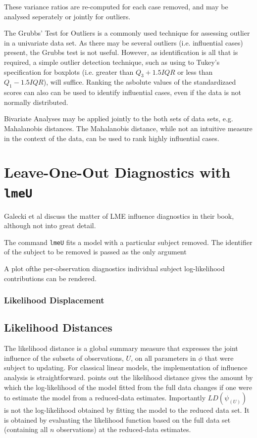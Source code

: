 \documentclass[12pt, a4paper]{report}
\theoremstyle{plain}
\theoremstyle{definition}
\theoremstyle{remark}
\begin{document}
These variance ratios are re-computed for each case removed, and may be analysed seperately or jointly for outliers. 

The Grubbs' Test for Outliers is a commonly used technique for assessing outlier in a univariate data set. As there may be several outliers (i.e. influential cases) present, the Grubbs test is not useful. However, as identification is all that is required, a simple outlier detection technique, such as using to Tukey's specification for boxplots (i.e. greater than $Q_3 +1.5 IQR$ or less than $Q_1 - 1.5 IQR$), will suffice. Ranking the asbolute values of the standardizaed scores can also can be used to identify influential cases, even if the data is not normally distributed.

Bivariate Analyses may be applied jointly to the both sets of data sets, e.g. Mahalanobis distances. The Mahalanobis distance, while not an intuitive measure in the context of the data, can be used to rank highly influential cases. 


\section*{Leave-One-Out Diagnostics with \texttt{lmeU}}
Galecki et al discuss the matter of LME influence diagnostics in their book, although not into great detail.


The command \texttt{lmeU} fits a model with a particular subject removed. The identifier of the subject to be removed is passed as the only argument

A plot ofthe per-observation diagnostics individual subject log-likelihood contributions can be rendered.

\subsubsection*{Likelihood Displacement}

\subsection{Likelihood Distances}

The  likelihood distance is a global summary measure that expresses the joint influence of the subsets of observations, $U$, on all parameters in $\phi$ that were subject to updating. For classical linear models, the implementation of influence analysis is straightforward. \citet{schab} points out the likelihood distance gives the amount by which the log-likelihood of the model fitted from the full data changes if one were
to estimate the model from a reduced-data estimates. Importantly $LD(\psi_{(U)})$ is not the log-likelihood obtained by fitting the model to the reduced data set. It is obtained by evaluating the likelihood function based on the full data set (containing all $n$ observations) at the reduced-data estimates.
\end{document}
